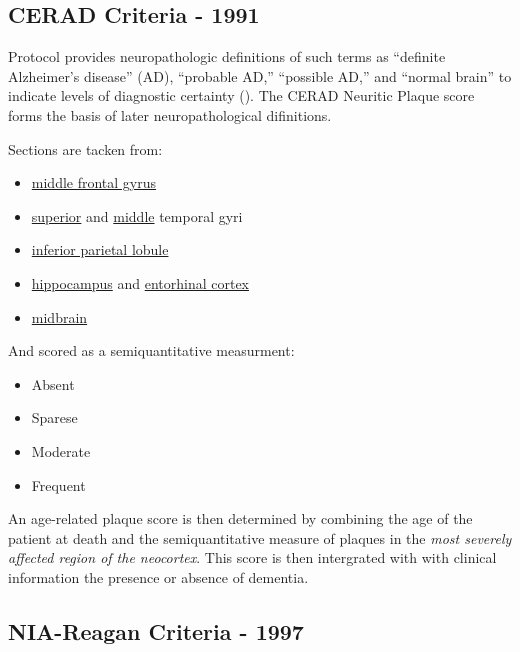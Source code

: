 \documentclass[]{book}
\providecommand{\tightlist}{%
  \setlength{\itemsep}{0pt}\setlength{\parskip}{0pt}}
\begin{document}
\hypertarget{cerad-criteria---1991}{%
\subsection{CERAD Criteria - 1991}\label{cerad-criteria---1991}}

Protocol provides neuropathologic definitions of such terms as ``definite Alzheimer's disease'' (AD), ``probable AD,'' ``possible AD,'' and ``normal brain'' to indicate levels of diagnostic certainty (\citet{Mirra479}). The CERAD Neuritic Plaque score forms the basis of later neuropathological difinitions.

Sections are tacken from:

\begin{itemize}
\tightlist
\item
  \href{https://en.wikipedia.org/wiki/Middle_frontal_gyrus}{middle frontal gyrus}
\item
  \href{https://en.wikipedia.org/wiki/Superior_temporal_gyrus}{superior} and \href{https://en.wikipedia.org/wiki/Middle_temporal_gyrus}{middle} temporal gyri
\item
  \href{https://en.wikipedia.org/wiki/Inferior_parietal_lobule}{inferior parietal lobule}
\item
  \href{https://en.wikipedia.org/wiki/Hippocampus}{hippocampus} and \href{https://en.wikipedia.org/wiki/Entorhinal_cortex}{entorhinal cortex}
\item
  \href{https://en.wikipedia.org/wiki/Midbrain}{midbrain}
\end{itemize}

And scored as a semiquantitative measurment:

\begin{itemize}
\tightlist
\item
  Absent
\item
  Sparese
\item
  Moderate
\item
  Frequent
\end{itemize}

An age-related plaque score is then determined by combining the age of the patient at death and the semiquantitative measure of plaques in the \emph{most severely affected region of the neocortex}. This score is then intergrated with with clinical information the presence or absence of dementia.

\hypertarget{nia-reagan-criteria---1997}{%
\subsection{NIA-Reagan Criteria - 1997}\label{nia-reagan-criteria---1997}}
\end{document}
